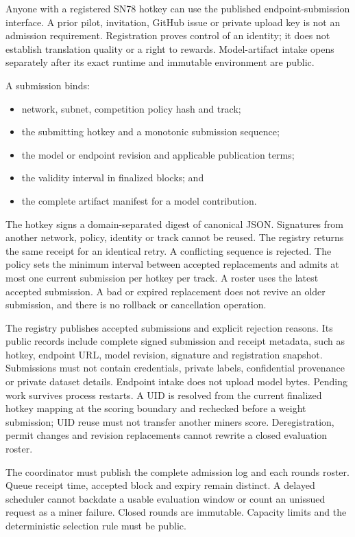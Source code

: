 Anyone with a registered SN78 hotkey can use the published endpoint-submission
interface. A prior pilot, invitation, GitHub issue or private upload key is not
an admission requirement. Registration proves control of an identity; it does
not establish translation quality or a right to rewards. Model-artifact intake
opens separately after its exact runtime and immutable environment are public.

A submission binds:

\begin{itemize}
\tightlist
\item
  network, subnet, competition policy hash and track;
\item
  the submitting hotkey and a monotonic submission sequence;
\item
  the model or endpoint revision and applicable publication terms;
\item
  the validity interval in finalized blocks; and
\item
  the complete artifact manifest for a model contribution.
\end{itemize}

The hotkey signs a domain-separated digest of canonical JSON. Signatures from
another network, policy, identity or track cannot be reused. The registry
returns the same receipt for an identical retry. A conflicting sequence is
rejected. The policy sets the minimum interval between accepted replacements
and admits at most one current submission per hotkey per track. A roster uses
the latest accepted submission. A bad or expired replacement does not revive an
older submission, and there is no rollback or cancellation operation.

The registry publishes accepted submissions and explicit rejection reasons.
Its public records include complete signed submission and receipt metadata, such
as hotkey, endpoint URL, model revision, signature and registration snapshot.
Submissions must not contain credentials, private labels, confidential
provenance or private dataset details. Endpoint intake does not upload model
bytes.
Pending work survives process restarts. A UID is resolved from the current
finalized hotkey mapping at the scoring boundary and rechecked before a
weight submission; UID reuse must not transfer another miner\textquotesingle s score.
Deregistration, permit changes and revision replacements cannot rewrite a
closed evaluation roster.

The coordinator must publish the complete admission log and each round\textquotesingle s
roster. Queue receipt time, accepted block and expiry remain distinct.
A delayed scheduler cannot backdate a usable evaluation window or count
an unissued request as a miner failure. Closed rounds are immutable.
Capacity limits and the deterministic selection rule must be public.

